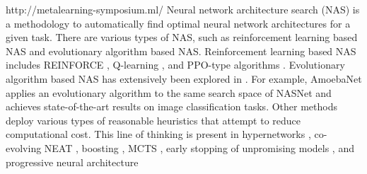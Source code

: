 \documentclass{article}
\begin{document}
http://metalearning-symposium.ml/%
Neural network architecture search (NAS) is a methodology to 
automatically find optimal neural network architectures for a given task. There are various 
types of NAS, such as reinforcement learning based NAS and evolutionary algorithm based NAS. 
Reinforcement learning based NAS includes REINFORCE \cite{zoph:rl_nas_google:DBLP:journals/corr/ZophL16}, 
Q-learning \cite{zhong:q_learning_nas:DBLP:journals/corr/abs-1708-05552, baker:rl_nas:DBLP:journals/corr/BakerGNR16}, 
and PPO-type algorithms \cite{zoph:nasnet_google:DBLP:journals/corr/ZophVSL17}. Evolutionary algorithm based NAS has extensively been explored in \cite{real:large_scale_nas_google:DBLP:conf/icml/RealMSSSTLK17,
miikkulainen:evolv_nas:DBLP:journals/corr/MiikkulainenLMR17, xie:genetic_cnn:DBLP:conf/iccv/XieY17, 
liu:hier_nas:DBLP:journals/corr/abs-1711-00436,
real:amoebanet_reg_nas:DBLP:journals/corr/abs-1802-01548}.
For example, AmoebaNet \cite{real:large_scale_nas_google:DBLP:conf/icml/RealMSSSTLK17} applies an evolutionary
algorithm to the same search space of NASNet and achieves state-of-the-art results on image classification tasks.
Other methods deploy various types of reasonable heuristics that attempt to reduce computational cost. 
This line of thinking is present in hypernetworks \cite{brock:smash:DBLP:journals/corr/abs-1708-05344}, co-evolving NEAT \cite{miikkulainen:evolv_nas:DBLP:journals/corr/MiikkulainenLMR17}, boosting \cite{cortes:adanet:DBLP:conf/icml/CortesGKMY17,  huang:boost_nas:DBLP:journals/corr/HuangALS17}, MCTS \cite{negrinho:deeparch:DBLP:journals/corr/NegrinhoG17}, early stopping of unpromising models \cite{baker:nas_perf_pred:DBLP:journals/corr/BakerGRN17}, and progressive neural architecture 
\end{document}
